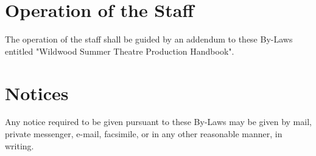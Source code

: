 \documentclass{article}
\begin{document}
\section{Operation of the Staff}
The operation of the staff shall be guided by an addendum to these By-Laws entitled "Wildwood Summer Theatre Production Handbook".

\section{Notices}
Any notice required to be given pursuant to these By-Laws may be given by mail, private messenger, e-mail, facsimile, or in any other reasonable manner, in writing.
\end{document}
